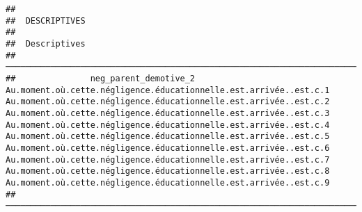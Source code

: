 \documentclass[
]{article}
\begin{document}
\begin{verbatim}
## 
##  DESCRIPTIVES
## 
##  Descriptives                                                                                                                                                                                                                                                                                                                                                                                                                                                                                                                                                                                                                                                                      
##  ───────────────────────────────────────────────────────────────────────────────────────────────────────────────────────────────────────────────────────────────────────────────────────────────────────────────────────────────────────────────────────────────────────────────────────────────────────────────────────────────────────────────────────────────────────────────────────────────────────────────────────────────────────────────────────────────────────────────────────────────────────────────────────────────────────────────────────────────────────────────────────────────────────────────────────────────────────────────────────────────────────────────── 
##               neg_parent_demotive_2    Au.moment.où.cette.négligence.éducationnelle.est.arrivée..est.c.1    Au.moment.où.cette.négligence.éducationnelle.est.arrivée..est.c.2    Au.moment.où.cette.négligence.éducationnelle.est.arrivée..est.c.3    Au.moment.où.cette.négligence.éducationnelle.est.arrivée..est.c.4    Au.moment.où.cette.négligence.éducationnelle.est.arrivée..est.c.5    Au.moment.où.cette.négligence.éducationnelle.est.arrivée..est.c.6    Au.moment.où.cette.négligence.éducationnelle.est.arrivée..est.c.7    Au.moment.où.cette.négligence.éducationnelle.est.arrivée..est.c.8    Au.moment.où.cette.négligence.éducationnelle.est.arrivée..est.c.9   
##  ───────────────────────────────────────────────────────────────────────────────────────────────────────────────────────────────────────────────────────────────────────────────────────────────────────────────────────────────────────────────────────────────────────────────────────────────────────────────────────────────────────────────────────────────────────────────────────────────────────────────────────────────────────────────────────────────────────────────────────────────────────────────────────────────────────────────────────────────────────────────────────────────────────────────────────────────────────────────────────────────────────────────── 

\end{verbatim}
\end{document}
